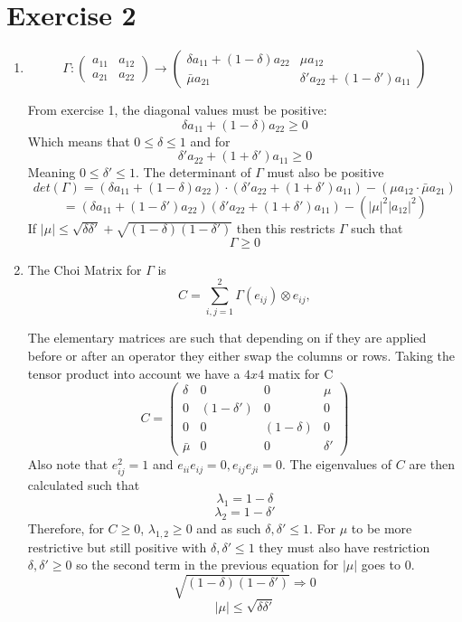 \documentclass[12pt]{article}
\begin{document}
\section{Exercise 2} 
\begin{enumerate}
    \item \begin{equation}
        \Gamma:\begin{pmatrix}
        a_{11}&a_{12}\\ a_{21}&a_{22}
        \end{pmatrix}\rightarrow\begin{pmatrix}
        \delta a_{11}+(1-\delta)a_{22}&\mu a_{12}\\ \bar{\mu} a_{21}&\delta' a_{22}+(1-\delta')a_{11}
        \end{pmatrix}
        \end{equation}
    
    From exercise 1, the diagonal values must be positive: 
    $$ \delta a_{11} + (1-\delta) a_{22} \geq 0 $$
    Which means that $0 \leq \delta \leq 1$ and for 
    $$ \delta' a_{22} + (1+ \delta') a_{11} \geq 0 $$
    Meaning $ 0 \leq \delta' \leq 1$. The determinant of $\Gamma$ must also be positive 
    $$ det(\Gamma) = (\delta a_{11} + (1- \delta) a_{22}) \cdot (\delta' a_{22} + (1+ \delta')a_{11}) - ( \mu a_{12} \cdot \bar{\mu}a_{21} ) $$
    $$ = (\delta a_{11} + (1- \delta')a_{22})(\delta' a_{22} + (1+ \delta') a_{11}) - (|\mu|^2 |a_{12}|^2) $$
    If $|\mu| \leq \sqrt{\delta \delta'} + \sqrt{(1-\delta)(1-\delta')} $ then this restricts $\Gamma$ such that 
    $$ \Gamma \geq 0 $$ 

    \item The Choi Matrix for $\Gamma$ is
    \begin{equation}
        C=\sum_{i,j=1}^2\Gamma(e_{ij})\otimes e_{ij},
        \end{equation}

    The elementary matrices are such that depending on if they are applied before or after an operator they either swap the columns or rows. Taking the tensor product into account we have a $4x4$ matix for C 
    $$C = \begin{pmatrix}
        \delta&0&0&\mu\\ 0&(1-\delta')&0&0\\0&0&(1- \delta)&0\\ \bar{\mu}&0&0&\delta'
        \end{pmatrix} $$
    Also note that $e_{ij}^2 =1$ and $e_{ii}e_{ij}=0, e_{ij}e_{ji}=0$. The eigenvalues of $C$ are then calculated such that 
    $$ \lambda_1 = 1-\delta $$
    $$ \lambda_2 = 1-\delta'$$ 
    Therefore, for $C \geq 0$, $\lambda_{1,2} \geq 0$ and as such $\delta, \delta' \leq 1$. For $\mu$ to be more restrictive but still positive with $\delta, \delta' \leq 1$ they must also have restriction $\delta, \delta' \geq 0$ so the second term in the previous equation for $|\mu|$ goes to 0. 
    $$ \sqrt{(1-\delta)(1-\delta')} \Rightarrow 0 $$
    $$ |\mu| \leq \sqrt{\delta \delta'} $$


\end{enumerate}
\end{document}
